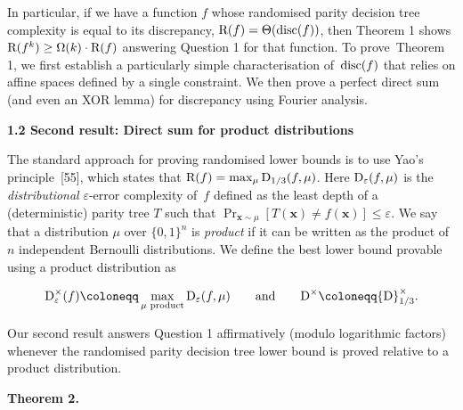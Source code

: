 \documentclass[10pt,a4paper]{article}
\begin{document}




In particular, if we have a function $f$ whose randomised parity decision tree complexity is equal to its discrepancy, ${\textup{R}}(f)=\Theta({\textup{disc}}(f))$, then Theorem 1 shows ${\textup{R}}(f^{k})\geq\Omega(k)\cdot{\textup{R}}(f)$ answering Question 1 for that function. To prove Theorem 1, we first establish a particularly simple characterisation of ${\textup{disc}}(f)$ that relies on affine spaces defined by a single constraint. We then prove a perfect direct sum (and even an XOR lemma) for discrepancy using Fourier analysis.\par





\par\medskip\noindent\textbf{
1.2 Second result: Direct sum for product distributions}\par




The standard approach for proving randomised lower bounds is to use Yao’s principle [55], which states that ${\textup{R}}(f)=\max_{\mu}{\textup{D}}_{1/3}(f,\mu)$. Here ${\textup{D}}_{\varepsilon}(f,\mu)$ is the \emph{distributional} $\varepsilon$-error complexity of $f$ defined as the least depth of a (deterministic) parity tree $T$ such that $\Pr_{\bm{x}\sim\mu}[T(\bm{x})\neq f(\bm{x})]\leq\varepsilon$. We say that a distribution $\mu$ over $\{0,1\}^{n}$ is \emph{product} if it can be written as the product of $n$ independent Bernoulli distributions. We define the best lower bound provable using a product distribution as\par


\[\begin{gathered}
{\textup{D}}^{\times}_{\varepsilon}(f)\coloneqq\max_{\mu\text{ product}}{\textup{D}}_{\varepsilon}(f,\mu)\qquad\text{and}\qquad{\textup{D}}^{\times}\coloneqq{\textup{D}}^{\times}_{1/3}.
\end{gathered}\]


Our second result answers Question 1 affirmatively (modulo logarithmic factors) whenever the randomised parity decision tree lower bound is proved relative to a product distribution.\par





\par\medskip\noindent\textbf{
\textbf{Theorem 2}\textbf{.}
}\par
\end{document}
